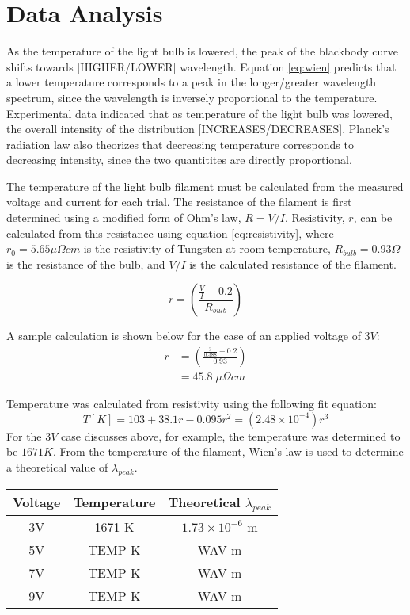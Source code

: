 \documentclass[a4paper]{article}
\begin{document}
\section{Data Analysis}

\qq As the temperature of the light bulb is lowered, the peak of the blackbody curve shifts towards [HIGHER/LOWER] wavelength. Equation \ref{eq:wien} predicts that a lower temperature corresponds to a peak in the longer/greater wavelength spectrum, since the wavelength is inversely proportional to the temperature. Experimental data indicated that as temperature of the light bulb was lowered, the overall intensity of the distribution [INCREASES/DECREASES]. Planck's radiation law also theorizes that decreasing temperature corresponds to decreasing intensity, since the two quantitites are directly proportional.

\qq The temperature of the light bulb filament must be calculated from the measured voltage and current for each trial. The resistance of the filament is first determined using a modified form of Ohm's law, $R=V/I$. Resistivity, $r$, can be calculated from this resistance using equation \ref{eq:resistivity}, where $r_0 = 5.65 \mu \Omega cm$ is the resistivity of Tungsten at room temperature, $R_{bulb}=0.93 \Omega$ is the resistance of the bulb, and $V/I$ is the calculated resistance of the filament. 

\begin{equation}
\label{eq:resistivity}
r =
\left(
\frac{\frac{V}{I}-0.2}{R_{bulb}}
\right)
\end{equation}

A sample calculation is shown below for the case of an applied voltage of $3V$:
\begin{align*}
r &=
\left(
\frac{\frac{3}{0.388}-0.2}{0.93}
\right) \\
&= 45.8 \; \mu \Omega cm
\end{align*}

Temperature was calculated from resistivity using the following fit equation:
$$T[K] = 103 + 38.1r - 0.095r^2 = (2.48\times 10^{-4}) r^3$$
For the $3V$ case discusses above, for example, the temperature was determined to be $1671K$. From the temperature of the filament, Wien's law is used to determine a theoretical value of $\lambda_{peak}$.

\begin{center}
\begin{tabular}{|c|c|c|}
\hline 
Voltage & Temperature & Theoretical $\lambda_{peak}$ \topVspace \bottomVspace \\
\hline
3V & 1671 K & $1.73 \times 10^{-6}$ m \\
5V & TEMP K & WAV m\\
7V & TEMP K & WAV m\\
9V & TEMP K & WAV m\\
\hline
\end{tabular}
\label{table:temps}
\end{center}
\end{document}
